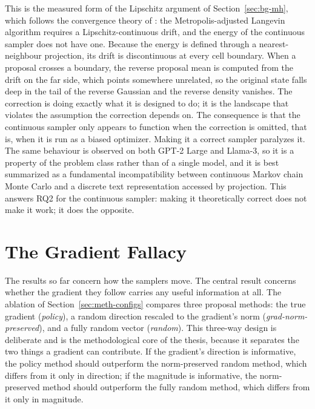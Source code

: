 This is the measured form of the Lipschitz argument of Section~\ref{sec:bg-mh}, which follows the convergence theory of \citet{roberts1996exponential}: the Metropolis-adjusted Langevin algorithm requires a Lipschitz-continuous drift, and the energy of the continuous sampler does not have one. Because the energy is defined through a nearest-neighbour projection, its drift is discontinuous at every cell boundary. When a proposal crosses a boundary, the reverse proposal mean is computed from the drift on the far side, which points somewhere unrelated, so the original state falls deep in the tail of the reverse Gaussian and the reverse density vanishes. The correction is doing exactly what it is designed to do; it is the landscape that violates the assumption the correction depends on. The consequence is that the continuous sampler only appears to function when the correction is omitted, that is, when it is run as a biased optimizer. Making it a correct sampler paralyzes it. The same behaviour is observed on both GPT-2 Large and Llama-3, so it is a property of the problem class rather than of a single model, and it is best summarized as a fundamental incompatibility between continuous Markov chain Monte Carlo and a discrete text representation accessed by projection. This answers RQ2 for the continuous sampler: making it theoretically correct does not make it work; it does the opposite.

\section{The Gradient Fallacy}
\label{sec:results-fallacy}

The results so far concern how the samplers move. The central result concerns whether the gradient they follow carries any useful information at all. The ablation of Section~\ref{sec:meth-configs} compares three proposal methods: the true gradient (\emph{policy}), a random direction rescaled to the gradient's norm (\emph{grad-norm-preserved}), and a fully random vector (\emph{random}). This three-way design is deliberate and is the methodological core of the thesis, because it separates the two things a gradient can contribute. If the gradient's direction is informative, the policy method should outperform the norm-preserved random method, which differs from it only in direction; if the magnitude is informative, the norm-preserved method should outperform the fully random method, which differs from it only in magnitude.

